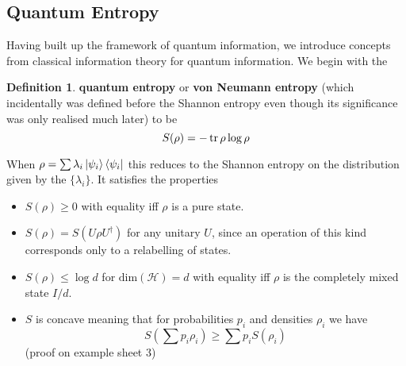 \documentclass{article}
\theoremstyle{definition}
\newtheorem{definition}{Definition}
\begin{document}
\subsection{Quantum Entropy}

Having built up the framework of quantum information, we introduce concepts 
from classical information theory for quantum information. We begin with the
\begin{definition}
  \textbf{quantum entropy} or \textbf{von Neumann entropy} (which incidentally
  was defined before the Shannon entropy even though its significance was only
  realised much later) to be 
  \begin{equation}
    S(\rho) = -\tr \rho \log \rho
  \end{equation}
\end{definition}
When $\rho = \sum \lambda_i \ket{\psi_i} \bra{\psi_i}$ this reduces to the 
Shannon entropy on the distribution given by the $\{\lambda_i\}$. It satisfies
the properties
\begin{itemize}
  \item $S(\rho) \geq 0$ with equality iff $\rho$ is a pure state.
  \item $S(\rho) = S(U\rho U^\dagger)$ for any unitary $U$, since an operation
    of this kind corresponds only to a relabelling of states.
  \item $S(\rho) \leq \log d$ for $\text{dim}(\mathcal{H}) = d$ with equality
    iff $\rho$ is the completely mixed state $I / d$.
  \item $S$ is concave meaning that for probabilities $p_i$ and densities 
    $\rho_i$ we have 
    \begin{equation}
      S( \sum p_i \rho_i ) \geq \sum p_i S(\rho_i)
    \end{equation}
    (proof on example sheet 3)
\end{itemize}
\end{document}
